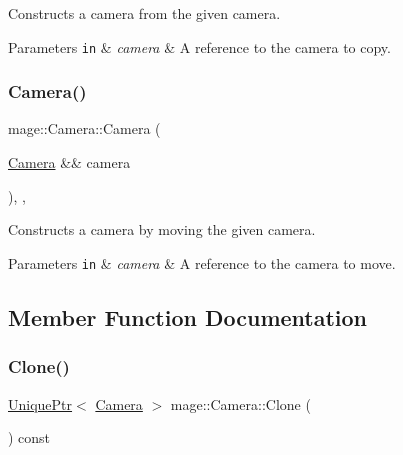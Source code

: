 Constructs a camera from the given camera.


\begin{DoxyParams}[1]{Parameters}
\mbox{\tt in}  & {\em camera} & A reference to the camera to copy. \\
\hline
\end{DoxyParams}
\hypertarget{classmage_1_1_camera_a858d43c7b166ef580c7d971719045371}{}\label{classmage_1_1_camera_a858d43c7b166ef580c7d971719045371} 
\subsubsection{\texorpdfstring{Camera()}{Camera()}\hspace{0.1cm}{\footnotesize\ttfamily [3/3]}}
{\footnotesize\ttfamily mage\+::\+Camera\+::\+Camera (\begin{DoxyParamCaption}\item[{\hyperlink{classmage_1_1_camera}{Camera} \&\&}]{camera }\end{DoxyParamCaption})\hspace{0.3cm}{\ttfamily [protected]}, {\ttfamily [default]}, {\ttfamily [noexcept]}}

Constructs a camera by moving the given camera.


\begin{DoxyParams}[1]{Parameters}
\mbox{\tt in}  & {\em camera} & A reference to the camera to move. \\
\hline
\end{DoxyParams}


\subsection{Member Function Documentation}
\hypertarget{classmage_1_1_camera_a830e9a071449f1026fd43fcd19577e6c}{}\label{classmage_1_1_camera_a830e9a071449f1026fd43fcd19577e6c} 
\subsubsection{\texorpdfstring{Clone()}{Clone()}}
{\footnotesize\ttfamily \hyperlink{namespacemage_a3316d7143a973e37adf1110f2e80ca31}{Unique\+Ptr}$<$ \hyperlink{classmage_1_1_camera}{Camera} $>$ mage\+::\+Camera\+::\+Clone (\begin{DoxyParamCaption}{ }\end{DoxyParamCaption}) const}

